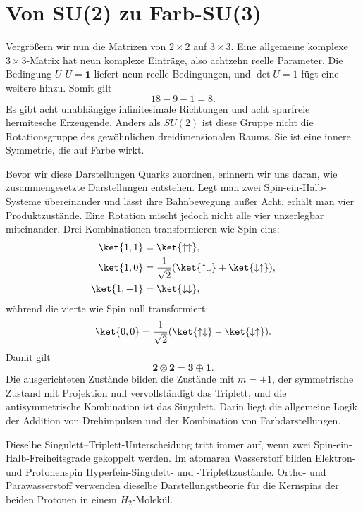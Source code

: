 \section{Von SU(2) zu Farb-SU(3)}

Vergrößern wir nun die Matrizen von \(2\times2\) auf \(3\times3\). Eine allgemeine komplexe \(3\times3\)-Matrix hat neun komplexe Einträge, also achtzehn reelle Parameter. Die Bedingung \(U^\dagger U=\boldsymbol 1\) liefert neun reelle Bedingungen, und \(\det U=1\) fügt eine weitere hinzu. Somit gilt
\begin{equation}
18-9-1=8.
\end{equation}
Es gibt acht unabhängige infinitesimale Richtungen und acht spurfreie hermitesche Erzeugende. Anders als \(SU(2)\) ist diese Gruppe nicht die Rotationsgruppe des gewöhnlichen dreidimensionalen Raums. Sie ist eine innere Symmetrie, die auf Farbe wirkt.

Bevor wir diese Darstellungen Quarks zuordnen, erinnern wir uns daran, wie zusammengesetzte Darstellungen entstehen. Legt man zwei Spin-ein-Halb-Systeme übereinander und lässt ihre Bahnbewegung außer Acht, erhält man vier Produktzustände. Eine Rotation mischt jedoch nicht alle vier unzerlegbar miteinander. Drei Kombinationen transformieren wie Spin eins:
\begin{align}
\ket{1,1}&=\ket{\uparrow\uparrow},\\
\ket{1,0}&=\frac{1}{\sqrt2}
(\ket{\uparrow\downarrow}+\ket{\downarrow\uparrow}),\\
\ket{1,-1}&=\ket{\downarrow\downarrow},
\end{align}
während die vierte wie Spin null transformiert:
\begin{equation}
\ket{0,0}=\frac{1}{\sqrt2}
(\ket{\uparrow\downarrow}-\ket{\downarrow\uparrow}).
\end{equation}
Damit gilt
\begin{equation}
\boldsymbol 2\otimes\boldsymbol 2
=\boldsymbol 3\oplus\boldsymbol 1.
\label{eq:l4-two-spin-decomposition}
\end{equation}
Die ausgerichteten Zustände bilden die Zustände mit \(m=\pm1\), der symmetrische Zustand mit Projektion null vervollständigt das Triplett, und die antisymmetrische Kombination ist das Singulett. Darin liegt die allgemeine Logik der Addition von Drehimpulsen und der Kombination von Farbdarstellungen.

Dieselbe Singulett--Triplett-Unterscheidung tritt immer auf, wenn zwei Spin-ein-Halb-Freiheitsgrade gekoppelt werden. Im atomaren Wasserstoff bilden Elektron- und Protonenspin Hyperfein-Singulett- und -Triplettzustände. Ortho- und Parawasserstoff verwenden dieselbe Darstellungstheorie für die Kernspins der beiden Protonen in einem \(H_2\)-Molekül.

